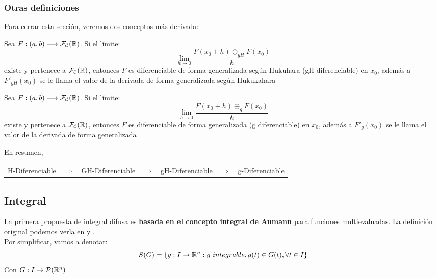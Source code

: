 \subsubsection{Otras definiciones}

Para cerrar esta sección, veremos dos conceptos más derivada:

\begin{definicion}
  Sea $F: (a, b) \longrightarrow \mathcal{F}_\mathcal{C}(\mathbb R)$. Si el límite:
  \[
  	\lim\limits_{h \rightarrow 0} \frac{F(x_0 + h) \circleddash_{gH} F(x_0)}{h}
  \]
  existe y pertenece a $\mathcal{F}_\mathcal{C} (\mathbb R)$, entonces $F$ es diferenciable de forma generalizada según Hukuhara (gH diferenciable) en $x_0$, además a $F'_{gH}(x_0)$ se le llama el valor de la derivada de forma generalizada según Hukukahara
\end{definicion}

\begin{definicion}
  \label{def:diferencial_generalizada}
  Sea $F: (a, b) \longrightarrow \mathcal{F}_\mathcal{C}(\mathbb R)$. Si el límite:
\[
\lim\limits_{h \rightarrow 0} \frac{F(x_0 + h) \circleddash_{g} F(x_0)}{h}
\]
existe y pertenece a $\mathcal{F}_\mathcal{C} (\mathbb R)$, entonces $F$ es diferenciable de forma generalizada (g diferenciable) en $x_0$, además a $F'_{g}(x_0)$ se le llama el valor de la derivada de forma generalizada
\end{definicion}

En resumen,
\begin{table}[h]
  \centering
  \begin{tabular}{lllllll}
    H-Diferenciable & $\Rightarrow$ & GH-Diferenciable & $\Rightarrow$ & gH-Diferenciable & $\Rightarrow$ & g-Diferenciable
  \end{tabular}
\end{table}

\subsection{Integral}
La primera propuesta de integral difusa es \textbf{basada en el concepto integral de Aumann \cite{aumannintegral}} para funciones multievaluadas. La definición original podemos verla en \cite{integral1} y \cite{integral2}. \\
Por simplificar, vamos a denotar:
\[
S(G) = \{g : I \rightarrow \mathbb R^n : g ~ integrable, g(t) \in G(t), \forall t \in I \}
\]
Con $G : I \rightarrow \mathcal{P}(\mathbb R^n)$


